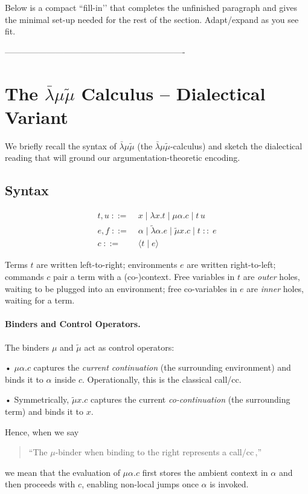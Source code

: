 \documentclass{ecai}
\newcommand{\matilda}{\bar{\lambda}\mu \tilde{\mu}}
\begin{document}
\begin{gpt}
  
Below is a compact “fill-in’’ that completes the unfinished paragraph and gives the minimal set-up needed for the rest of the section.  Adapt/expand as you see fit.

----------------------------------------------------------------
\section{The $\matilda$ Calculus – Dialectical Variant}\label{sec:matilda}

We briefly recall the syntax of $\matilda$ (the $\bar\lambda\mu\tilde\mu$-calculus) and sketch the dialectical reading that will ground our argumentation-theoretic encoding.

\subsection{Syntax}

\begin{align*}
  t,u \;::=&\; x 
        \mid \lambda x.t
        \mid \mu \alpha.c
        \mid t\,u\\[2mm]
  e,f \;::=&\; \alpha
        \mid \tilde{\lambda}\alpha.e
        \mid \tilde{\mu}x.c
        \mid t\;::\;e\\[2mm]
  c   \;::=&\; \langle t \mid e\rangle
\end{align*}

Terms $t$ are written left-to-right; environments $e$ are written right-to-left; commands $c$ pair a term with a (co-)context.  Free variables in $t$ are \emph{outer} holes, waiting to be plugged into an environment; free co-variables in $e$ are \emph{inner} holes, waiting for a term.

\paragraph{Binders and Control Operators.}
The binders $\mu$ and $\tilde\mu$ act as control operators:

• $\mu\alpha.c$ captures the \emph{current continuation} (the surrounding environment) and binds it to $\alpha$ inside $c$.  
  Operationally, this is the classical \textsf{call/cc}.  

• Symmetrically, $\tilde\mu x.c$ captures the current \emph{co-continuation} (the surrounding term) and binds it to $x$.

Hence, when we say
\begin{quote}
“The $\mu$-binder when binding to the right represents a \textsf{call/cc}\,,”
\end{quote}
we mean that the evaluation of $\mu\alpha.c$ first stores the ambient context in $\alpha$ and then proceeds with $c$, enabling non-local jumps once $\alpha$ is invoked.


\end{gpt}
\end{document}

